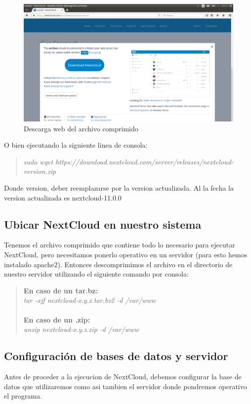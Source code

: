 \documentclass[11pt]{article}
\begin{document}
\begin{figure}[htp]
\centering
\includegraphics[scale=0.30]{download2.png}
\caption{Descarga web del archivo comprimido}
\label{}
\end{figure}
O bien ejecutando la siguiente linea de consola:
\begin{quote}
\emph{sudo wget https://download.nextcloud.com/server/releases/nextcloud-version.zip}\\
\end{quote}

Donde version, deber reemplazarse por la version actualizada. Al la fecha la version actualizada es nextcloud-11.0.0

\subsection{Ubicar NextCloud en nuestro sistema}
Tenemos el archivo comprimido que contiene todo lo necesario para ejecutar NextCloud, pero necesitamos ponerlo operativo en un servidor (para esto hemos instalado apache2). Entonces descomprimimos el archivo en el directorio de nuestro servidor utilizando el siguiente comando por consola:

\begin{quote}
\textbf{En caso de un tar.bz:}\\
\emph{tar -xjf nextcloud-x.y.z.tar.bz2 -d /var/www}\\\\
\textbf{En caso de un .zip:}\\
\emph{unzip nextcloud-x.y.z.zip -d /var/www}
\end{quote}
	
\subsection{Configuración de bases de datos y servidor}
Antes de proceder a la ejecucion de NextCloud, debemos configurar la base de datos que utilizaremos como asi tambien el servidor donde pondremos operativo el programa.
\end{document}
